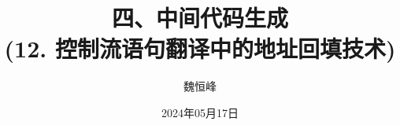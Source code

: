 \documentclass[]{beamer}
\title[中间代码生成]{四、中间代码生成 \\ (12. 控制流语句翻译中的地址回填技术)}
\author[魏恒峰]{\large 魏恒峰}
\institute{hfwei@nju.edu.cn}
\date{2024年05月17日}
\begin{document}
\maketitle




\thankyou{}

\end{document}
